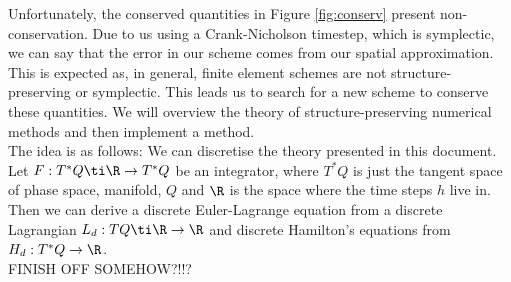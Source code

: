\newpage
\noindent
Unfortunately, the conserved quantities in Figure \ref{fig:conserv} present non-conservation. Due to us using a Crank-Nicholson timestep, which is symplectic, we can say that the error in our scheme comes from our spatial approximation. This is expected as, in general, finite element schemes are not structure-preserving or symplectic. This leads us to search for a new scheme to conserve these quantities. We will overview the theory of structure-preserving numerical methods and then implement a method. \\

\noindent
The idea is as follows: We can discretise the theory presented in this document. Let $F : T^*Q \ti \R \to T^*Q$ be an integrator, where $T^*Q$ is just the tangent space of phase space, manifold, $Q$ and $\R$ is the space where the time steps $h$ live in. Then we can derive a discrete Euler-Lagrange equation from a discrete Lagrangian $L_d : TQ \ti \R \to \R$ and discrete Hamilton's equations from $H_d : T^*Q\to \R$.\\

\noindent
FINISH OFF SOMEHOW?!!?

